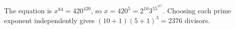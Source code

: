 The equation is $x^{84}=420^{420}$, so $x=420^5=2^{10}3^55^57^5$. Choosing each prime exponent independently gives $(10+1)(5+1)^3=\boxed{2376}$ divisors.
